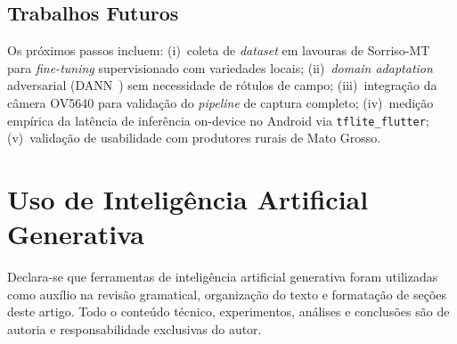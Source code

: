 \documentclass[12pt]{article}
\begin{document}
\subsection{Trabalhos Futuros}

Os próximos passos incluem: (i)~coleta de \textit{dataset} em lavouras de Sorriso-MT
para \textit{fine-tuning} supervisionado com variedades locais; (ii)~\textit{domain
adaptation} adversarial (DANN~\cite{ganin2016}) sem necessidade de rótulos de campo;
(iii)~integração da câmera OV5640 para validação do \textit{pipeline} de captura
completo;
(iv)~medição empírica da latência de inferência on-device no Android via
\texttt{tflite\_flutter}; (v)~validação de usabilidade com produtores rurais de
Mato Grosso.


\section*{Uso de Inteligência Artificial Generativa}

Declara-se que ferramentas de inteligência artificial generativa
foram utilizadas como auxílio na revisão gramatical, organização do
texto e formatação de seções deste artigo. Todo o conteúdo técnico,
experimentos, análises e conclusões são de autoria e responsabilidade exclusivas
do autor.



\end{document}
